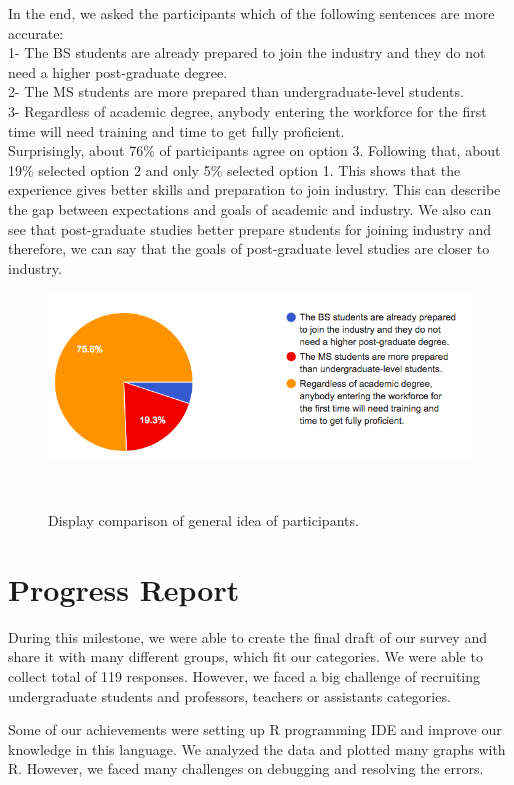 \documentclass{sigchi}
\begin{document}
In the end, we asked the participants which of the following sentences are more accurate:\\

1- The BS students are already prepared to join the industry and they do not need a higher post-graduate degree.\\
2- The MS students are more prepared than undergraduate-level students.\\
3- Regardless of academic degree, anybody entering the workforce for the first time will need training and time to get fully proficient.\\

Surprisingly, about 76\% of participants agree on option 3. Following that, about 19\% selected option 2 and only 5\% selected option 1. This shows that the experience gives better skills and preparation to join industry. This can describe the gap between expectations and goals of academic and industry. We also can see that post-graduate studies better prepare students for joining industry and therefore, we can say that the goals of post-graduate level studies are closer to industry.

\begin{figure}
\centering
  \includegraphics[width=1.05\columnwidth]{figures/general_accurate_sentence}
  \caption{Display comparison of general idea of participants.}~\label{fig:figure 8}
\end{figure}

\section{Progress Report}
During this milestone, we were able to create the final draft of our survey and share it with many different groups, which fit our categories. We were able to collect total of 119 responses. However, we faced a big challenge of recruiting undergraduate students and professors, teachers or assistants categories.

Some of our achievements were setting up R programming IDE and improve our knowledge in this language. We analyzed the data and plotted many graphs with R. However, we faced many challenges on debugging and resolving the errors.
\end{document}
